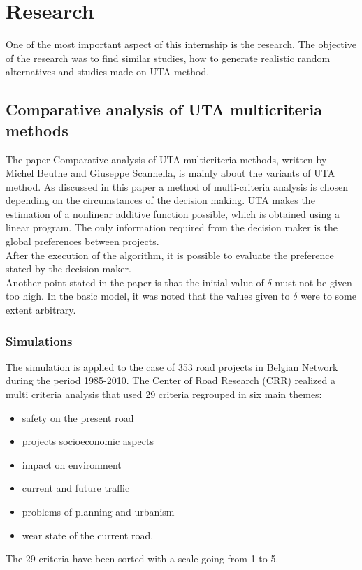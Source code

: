 \documentclass{report}
\begin{document}
\section{Research}
One of the most important aspect of this internship is the research. The objective of the research was to find similar studies, how to generate realistic random alternatives and studies made on UTA method.
\subsection{Comparative analysis of UTA multicriteria methods}
The paper Comparative analysis of UTA multicriteria methods, written by Michel Beuthe and Giuseppe Scannella, is mainly about the variants of UTA method. As discussed in this paper a method of multi-criteria analysis is chosen depending on the circumstances of the decision making. UTA makes the estimation of a nonlinear additive function possible, which is obtained using a linear program. The only information required from the decision maker is the global preferences between projects. \\
After the execution of the algorithm, it is possible to evaluate the preference stated by the decision maker.\\
Another point stated in the paper is that the initial value of $\delta$ must not be given too high. In the basic model, it was noted that the values given to $\delta$ were to some extent arbitrary. 
\subsubsection{Simulations}
The simulation is applied to the case of 353 road projects in Belgian Network during the period 1985-2010. The Center of Road Research (CRR) realized a multi criteria analysis that used 29 criteria regrouped in six main themes: 
\begin{itemize}
\item safety on the present road
\item projects socioeconomic aspects
\item impact on environment
\item current and future traffic
\item problems of planning and urbanism
\item wear state of the current road.
\end{itemize}
The 29 criteria have been sorted with a scale going from 1 to 5. 
\end{document}
